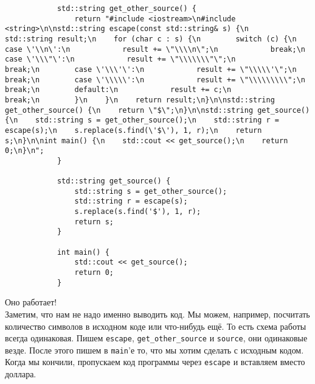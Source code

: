 \documentclass{article}
\begin{document}
\begin{remark}
\begin{verbatim}
            std::string get_other_source() {
                return "#include <iostream>\n#include <string>\n\nstd::string escape(const std::string& s) {\n    std::string result;\n    for (char c : s) {\n        switch (c) {\n        case \'\\n\':\n            result += \"\\\\n\";\n            break;\n        case \'\\\"\':\n            result += \"\\\\\\\"\";\n            break;\n        case \'\\\'\':\n            result += \"\\\\\'\";\n            break;\n        case \'\\\\\':\n            result += \"\\\\\\\\\";\n            break;\n        default:\n            result += c;\n            break;\n        }\n    }\n    return result;\n}\n\nstd::string get_other_source() {\n    return \"$\";\n}\n\nstd::string get_source() {\n    std::string s = get_other_source();\n    std::string r = escape(s);\n    s.replace(s.find(\'$\'), 1, r);\n    return s;\n}\n\nint main() {\n    std::cout << get_source();\n    return 0;\n}\n";
            }
            
            std::string get_source() {
                std::string s = get_other_source();
                std::string r = escape(s);
                s.replace(s.find('$'), 1, r);
                return s;
            }
            
            int main() {
                std::cout << get_source();
                return 0;
            }
        \end{verbatim}
        Оно работает!\\
        Заметим, что нам не надо именно выводить код. Мы можем, например, посчитать количество символов в исходном коде или что-нибудь ещё. То есть схема работы всегда одинаковая. Пишем \Verb|escape|, \Verb|get_other_source| и \Verb|source|, они одинаковые везде. После этого пишем в \Verb|main|'е то, что мы хотим сделать с исходным кодом. Когда мы кончили, пропускаем код программы через \Verb|escape| и вставляем вместо доллара.
    \end{remark}
\end{document}
